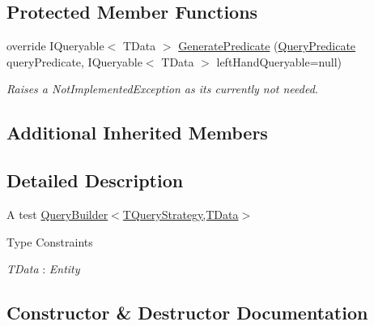 \subsection*{Protected Member Functions}
\begin{DoxyCompactItemize}
\item 
override I\+Queryable$<$ T\+Data $>$ \hyperlink{classCqrs_1_1Azure_1_1BlobStorage_1_1Test_1_1Integration_1_1TestQueryBuilder_a33024ff6952fe0dbc51409e23c217ece_a33024ff6952fe0dbc51409e23c217ece}{Generate\+Predicate} (\hyperlink{classCqrs_1_1Repositories_1_1Queries_1_1QueryPredicate}{Query\+Predicate} query\+Predicate, I\+Queryable$<$ T\+Data $>$ left\+Hand\+Queryable=null)
\begin{DoxyCompactList}\small\item\em Raises a Not\+Implemented\+Exception as it\textquotesingle{}s currently not needed. \end{DoxyCompactList}\end{DoxyCompactItemize}
\subsection*{Additional Inherited Members}


\subsection{Detailed Description}
A test \hyperlink{classCqrs_1_1Repositories_1_1Queries_1_1QueryBuilder_a8a7b6495f78adedc7b7a82d2c83f17d5_a8a7b6495f78adedc7b7a82d2c83f17d5}{Query\+Builder$<$\+T\+Query\+Strategy,\+T\+Data$>$} 

\begin{Desc}
\item[Type Constraints]\begin{description}
\item[{\em T\+Data} : {\em Entity}]\end{description}
\end{Desc}


\subsection{Constructor \& Destructor Documentation}
\mbox{\label{classCqrs_1_1Azure_1_1BlobStorage_1_1Test_1_1Integration_1_1TestQueryBuilder_a22e5b4e327afe4f0f0d34e273dfd72ac_a22e5b4e327afe4f0f0d34e273dfd72ac}} 
